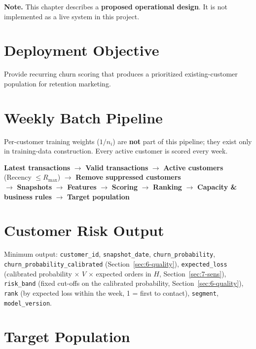 \textbf{Note.} This chapter describes a \textbf{proposed operational design}. It is not implemented as a live system in this project.

\section{Deployment Objective}
\label{sec:8-1}

Provide recurring churn scoring that produces a prioritized existing-customer population for retention marketing.

\section{Weekly Batch Pipeline}
\label{sec:8-2}

Per-customer training weights ($1/n_i$) are \textbf{not} part of this pipeline; they exist only in training-data construction. Every active customer is scored every week.

\begin{center}
\textbf{Latest transactions} $\rightarrow$ \textbf{Valid transactions} $\rightarrow$ \textbf{Active customers} (Recency $\leq R_{\max}$) $\rightarrow$ \textbf{Remove suppressed customers} \\[0.3cm]
$\rightarrow$ \textbf{Snapshots} $\rightarrow$ \textbf{Features} $\rightarrow$ \textbf{Scoring} $\rightarrow$ \textbf{Ranking} $\rightarrow$ \textbf{Capacity \& business rules} $\rightarrow$ \textbf{Target population}
\end{center}

\section{Customer Risk Output}
\label{sec:8-3}

Minimum output: \texttt{customer\_id}, \texttt{snapshot\_date}, \texttt{churn\_probability}, \texttt{churn\_probability\_calibrated} (Section~\ref{sec:6-quality}), \texttt{expected\_loss} (calibrated probability $\times$ $V$ $\times$ expected orders in $H$, Section~\ref{sec:7-sens}), \texttt{risk\_band} (fixed cut-offs on the calibrated probability, Section~\ref{sec:6-quality}), \texttt{rank} (by expected loss within the week, 1 = first to contact), \texttt{segment}, \texttt{model\_version}.

\section{Target Population}
\label{sec:8-4}

